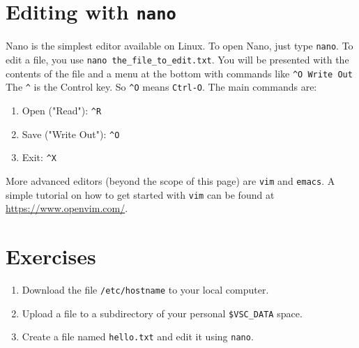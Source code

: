 \section{Editing with \texttt{nano}}

Nano is the simplest editor available on Linux. To open Nano, just type
\verb|nano|. To edit a file, you use \verb|nano the_file_to_edit.txt|. You will
be presented with the contents of the file and a menu at the bottom with
commands like \verb|^O Write Out| The \verb|^| is the Control key. So \verb|^O| means
\verb|Ctrl-O|. The main commands are:

\begin{enumerate}
\item Open ("Read"): \verb|^R|
\item Save ("Write Out"): \verb|^O|
\item Exit: \verb|^X|
\end{enumerate}

More advanced editors (beyond the scope of this page) are \verb|vim| and \verb|emacs|.
A simple tutorial on how to get started with \verb|vim| can be found at \url{https://www.openvim.com/}.

\section{Exercises}

\begin{enumerate}
    \item Download the file \verb|/etc/hostname| to your local computer.
    \item Upload a file to a subdirectory of your personal \verb|$VSC_DATA| space.
    \item Create a file named \verb|hello.txt| and edit it using \verb|nano|.
\end{enumerate}
